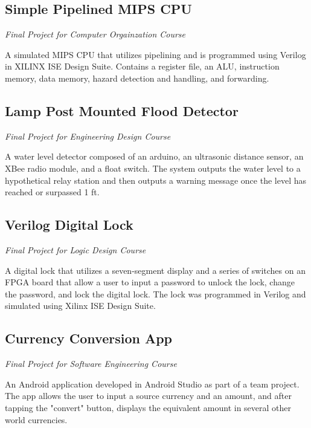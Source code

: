 \documentclass{article}
\begin{document}
\subsection{Simple Pipelined MIPS CPU} \textit{Final Project for Computer Orgainzation Course}

A simulated MIPS CPU that utilizes pipelining and is programmed using Verilog in XILINX ISE Design Suite. Contains a register file, an ALU, instruction memory, data memory, hazard detection and handling, and forwarding.
\vspace{-.75em}
\subsection{Lamp Post Mounted Flood Detector} \textit{Final Project for Engineering Design Course}

A water level detector composed of an arduino, an ultrasonic distance sensor, an XBee radio module, and a float switch. The system outputs the water level to a hypothetical relay station and then outputs a warning message once the level has reached or surpassed 1 ft.
\vspace{-.75em}
\subsection{Verilog Digital Lock} \textit{Final Project for Logic Design Course}

A digital lock that utilizes a seven-segment display and a series of switches on an FPGA board that allow a user to input a password to unlock the lock, change the password, and lock the digital lock. The lock was programmed in Verilog and simulated using Xilinx ISE Design Suite.
\vspace{-.75em}
\subsection{Currency Conversion App} \textit{Final Project for Software Engineering Course}

An Android application developed in Android Studio as part of a team project. The app allows the user to input a source currency and an amount, and after tapping the "convert" button, displays the equivalent amount in several other world currencies.
\end{document}
